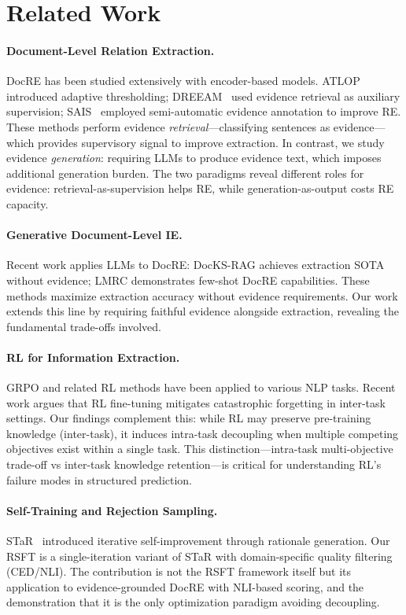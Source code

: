\documentclass[11pt]{article}
\begin{document}
\section{Related Work}

\paragraph{Document-Level Relation Extraction.}
DocRE has been studied extensively with encoder-based models. ATLOP~\cite{zhou2021atlop} introduced adaptive thresholding; DREEAM~\cite{tan2022dreeam} used evidence retrieval as auxiliary supervision; SAIS~\cite{xu2022sais} employed semi-automatic evidence annotation to improve RE. These methods perform evidence \emph{retrieval}---classifying sentences as evidence---which provides supervisory signal to improve extraction. In contrast, we study evidence \emph{generation}: requiring LLMs to produce evidence text, which imposes additional generation burden. The two paradigms reveal different roles for evidence: retrieval-as-supervision helps RE, while generation-as-output costs RE capacity.

\paragraph{Generative Document-Level IE.}
Recent work applies LLMs to DocRE: DocKS-RAG achieves extraction SOTA without evidence; LMRC demonstrates few-shot DocRE capabilities. These methods maximize extraction accuracy without evidence requirements. Our work extends this line by requiring faithful evidence alongside extraction, revealing the fundamental trade-offs involved.

\paragraph{RL for Information Extraction.}
GRPO and related RL methods have been applied to various NLP tasks. Recent work argues that RL fine-tuning mitigates catastrophic forgetting in inter-task settings. Our findings complement this: while RL may preserve pre-training knowledge (inter-task), it induces intra-task decoupling when multiple competing objectives exist within a single task. This distinction---intra-task multi-objective trade-off vs inter-task knowledge retention---is critical for understanding RL's failure modes in structured prediction.

\paragraph{Self-Training and Rejection Sampling.}
STaR~\cite{zelikman2022star} introduced iterative self-improvement through rationale generation. Our RSFT is a single-iteration variant of STaR with domain-specific quality filtering (CED/NLI). The contribution is not the RSFT framework itself but its application to evidence-grounded DocRE with NLI-based scoring, and the demonstration that it is the only optimization paradigm avoiding decoupling.
\end{document}
